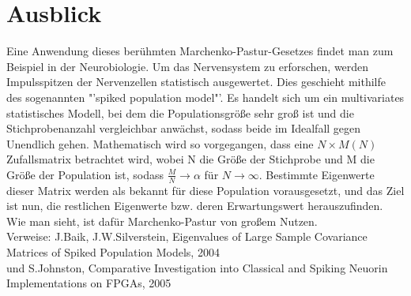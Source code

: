 \documentclass[a4paper, 11pt]{scrreprt}
\newcommand{\student}[1]{\marginnote{{\normalfont\bf #1}}}
\begin{document}
\newpage
\section*{Ausblick}
\student{gemeinsam}
Eine Anwendung dieses berühmten Marchenko-Pastur-Gesetzes findet man zum Beispiel in der Neurobiologie. Um das Nervensystem zu erforschen, werden Impulsspitzen der Nervenzellen statistisch ausgewertet. Dies geschieht mithilfe des sogenannten "'spiked population model"'. Es handelt sich um ein multivariates statistisches Modell, bei dem die Populationsgröße sehr groß ist und die Stichprobenanzahl vergleichbar anwächst, sodass beide im Idealfall gegen Unendlich gehen. Mathematisch wird so vorgegangen, dass eine $ N \times M(N) $ Zufallsmatrix betrachtet wird, wobei N die Größe der Stichprobe und M die Größe der Population ist, sodass $ \frac{M}{N} \rightarrow \alpha$ für $N \rightarrow \infty $. Bestimmte Eigenwerte dieser Matrix werden als bekannt für diese Population vorausgesetzt, und das Ziel ist nun, die restlichen Eigenwerte bzw. deren Erwartungswert herauszufinden. Wie man sieht, ist dafür Marchenko-Pastur von großem Nutzen.\\

Verweise: J.Baik, J.W.Silverstein, Eigenvalues of Large Sample Covariance Matrices of Spiked Population Models, 2004\\
und S.Johnston, Comparative Investigation into Classical and Spiking Neuorin Implementations on FPGAs, 2005
\end{document}
